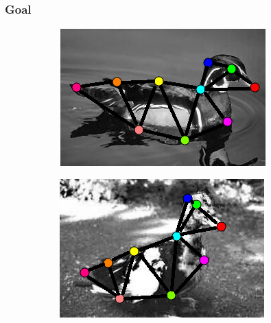 \documentclass[hyperref={pdfpagelabels=false}]{beamer}
\begin{document}
\begin{frame}
\frametitle{Goal}

\begin{figure}[h!]
    \centering
    \begin{subfigure}[b]{0.45\textwidth}
        \includegraphics[width=\textwidth]{fig/duck1}
    \end{subfigure}
    \begin{subfigure}[b]{0.45\textwidth}
        \includegraphics[width=\textwidth]{fig/duck2}
    \end{subfigure}
\end{figure}

\end{frame}
\end{document}
